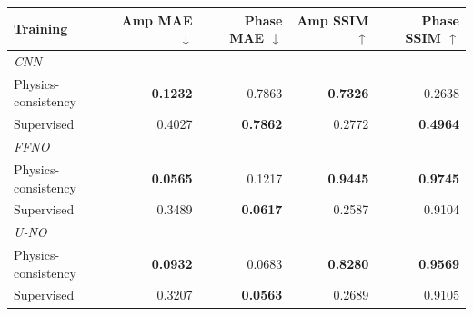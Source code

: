 \begin{tabular}{lrrrr}
\toprule
Training & Amp MAE $\downarrow$ & Phase MAE $\downarrow$ & Amp SSIM $\uparrow$ & Phase SSIM $\uparrow$ \\
\midrule
\multicolumn{5}{l}{\textit{CNN}} \\
\midrule
Physics-consistency & \textbf{0.1232} & 0.7863 & \textbf{0.7326} & 0.2638 \\
Supervised & 0.4027 & \textbf{0.7862} & 0.2772 & \textbf{0.4964} \\
\midrule
\multicolumn{5}{l}{\textit{FFNO}} \\
\midrule
Physics-consistency & \textbf{0.0565} & 0.1217 & \textbf{0.9445} & \textbf{0.9745} \\
Supervised & 0.3489 & \textbf{0.0617} & 0.2587 & 0.9104 \\
\midrule
\multicolumn{5}{l}{\textit{U-NO}} \\
\midrule
Physics-consistency & \textbf{0.0932} & 0.0683 & \textbf{0.8280} & \textbf{0.9569} \\
Supervised & 0.3207 & \textbf{0.0563} & 0.2689 & 0.9105 \\
\bottomrule
\end{tabular}
